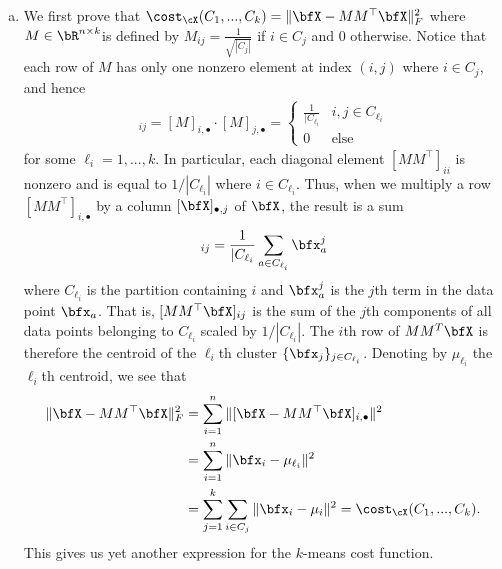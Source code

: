 \begin{homework}[e]
\begin{prf}
\begin{enumerate}[(a)]
    \item We first prove that $\cost_\cX(C_1,...,C_k) = \|\bfX - MM^\top\bfX\|^2_F$ where $M\in \bR^{n\times k}$is defined by $M_{ij} = \frac{1}{\sqrt{|C_j|}}$ if $i \in C_j$ and $0$ otherwise. Notice that each row of $M$ has only one nonzero element at index $(i,j)$ where $i \in C_j$, and hence
      \begin{align*}
        [MM^\top]_{ij} = [M]_{i,\bullet} \cdot [M]_{j,\bullet} =
        \begin{cases}
          \frac{1}{|C_{\ell_i}} & i,j \in C_{\ell_i} \\
          0 & \text{else}
        \end{cases}
      \end{align*}
      for some $\ell_i = 1,...,k$. In particular, each diagonal element $[MM^\top]_{ii}$ is nonzero and is equal to $1/|C_{\ell_i}|$ where $i \in C_{\ell_i}$. Thus, when we multiply a row $[MM^\top]_{i,\bullet}$ by a column $[\bfX]_{\bullet,j}$ of $\bfX$, the result is a sum
      \begin{align*}
        [MM^\top\bfX]_{ij} = \frac{1}{|C_{\ell_i}}\sum_{a \in C_{\ell_i}} \bfx_{a}^j
      \end{align*}
      where $C_{\ell_i}$ is the partition containing $i$ and $\bfx_a^j$ is the $j$th term in the data point $\bfx_a$. That is, $[MM^\top\bfX]_{ij}$ is the sum of the $j$th components of all data points belonging to $C_{\ell_i}$ scaled by $1/|C_{\ell_i}|$. The $i$th row of $MM^T\bfX$ is therefore the centroid of the $\ell_i$th cluster $\{\bfx_j\}_{j \in C_{\ell_i}}$. Denoting by $\mu_{\ell_i}$ the $\ell_i$th centroid, we see that
      \begin{align*}
        \|\bfX - MM^\top\bfX\|^2_F 
          &= \sum_{i=1}^n\|[\bfX - MM^\top\bfX]_{i,\bullet}\|^2 \\
          &= \sum_{i=1}^n\|\bfx_i - \mu_{\ell_i}\|^2 \\
          &= \sum_{j=1}^k\sum_{i\in C_j} \|\bfx_i - \mu_i\|^2 = \cost_\cX(C_1,...,C_k).
      \end{align*}
      This gives us yet another expression for the $k$-means cost function.


\end{enumerate}
\end{prf}
\end{homework}
